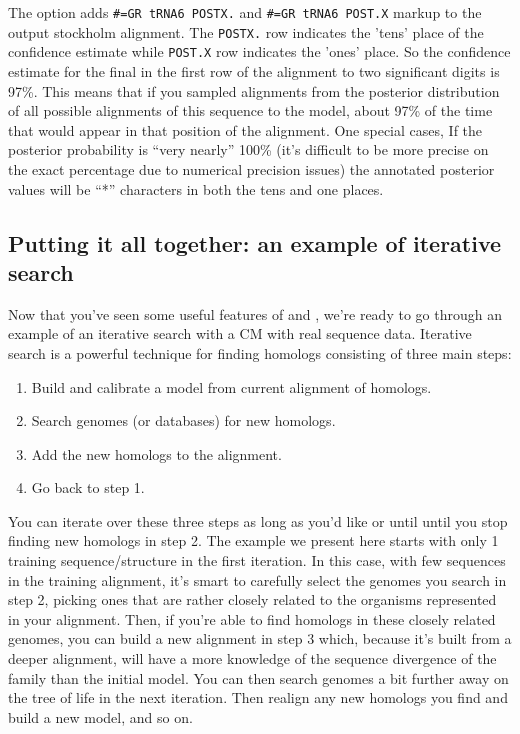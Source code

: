 The  option adds {\small\verb+#=GR tRNA6 POSTX.+} and
{\small\verb+#=GR tRNA6 POST.X+} markup to the output stockholm
alignment. The {\small\verb+POSTX.+} row indicates the 'tens' place of
the confidence estimate while {\small\verb+POST.X+} row indicates the
'ones' place. So the confidence estimate for the final  in the
first row of the alignment to two significant digits is 97\%. This
means that if you sampled alignments from the posterior distribution
of all possible alignments of this sequence to the model, about 97\%
of the time that  would appear in that position of the
alignment. One special cases, If the posterior probability is ``very
nearly'' 100\% (it's difficult to be more precise on the exact
percentage due to numerical precision issues) the annotated posterior
values will be ``*'' characters in both the tens and one places.

\newpage
\subsection{Putting it all together: an example of iterative search}

Now that you've seen some useful features of  and
, we're ready to go through an example of an iterative
search with a CM with real sequence data. Iterative search is a powerful
technique for finding homologs consisting of three main steps:
\begin{enumerate}
\item
  Build and calibrate a model from current alignment of homologs.
\item 
  Search genomes (or databases) for new homologs.
\item
  Add the new homologs to the alignment.
\item
  Go back to step 1.
\end{enumerate}

You can iterate over these three steps as long as you'd like or until
until you stop finding new homologs in step 2.  The example we present
here starts with only 1 training sequence/structure in the first
iteration. In this case, with few sequences in the training alignment,
it's smart to carefully select the genomes you search in step 2,
picking ones that are rather closely related to the organisms
represented in your alignment. Then, if you're able to find homologs
in these closely related genomes, you can build a new alignment
in step 3 which, because it's built from a deeper alignment, will have
a more knowledge of the sequence divergence of the family than
the initial model. You can then search genomes a bit further away on
the tree of life in the next iteration. Then realign any new homologs
you find and build a new model, and so on. 

